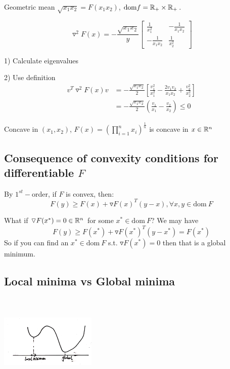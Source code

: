 \begin{example}
	Geometric mean $\sqrt{x_1x_2} = F(x_1x_2)$, $\text{dom}f = \mathbb{R}_+ \times \mathbb{R}_+$.
	
	\begin{equation*}
	\triangledown^2F(x) = -\frac{\sqrt{x_1x_2}}{y}\begin{bmatrix}
	\frac{1}{x^2_1} & -\frac{1}{x_1x_2}\\
	-\frac{1}{x_1x_2} & \frac{1}{x^2_2}
	\end{bmatrix}
	\end{equation*}
	
	1) Calculate eigenvalues
	
	2) Use definition
	\begin{align*}
	v^T\triangledown^2F(x)v &= -\frac{\sqrt{x_1x_2}}{2}[\frac{v_1^2}{x_1^2} - \frac{2v_1v_2}{x_1x_2} + \frac{v_2^2}{x^2_2}]\\
	&= -\frac{\sqrt{x_1x_2}}{2}(\frac{v_1}{x_1} -\frac{v_2}{x_2}) \leq 0
	\end{align*}
	
	Concave in $(x_1, x_2)$, $F(x) = (\prod^n_{i=1}x_i)^{\frac{1}{n}}$ is concave in $x\in \mathbb{R}^n$
\end{example}

\subsection{Consequence of convexity conditions for differentiable $F$}

\quad By $1^{st}-$order, if $F$ is convex, then:
$$F(y)\geq F(x) + \triangledown F(x)^T(y-x), \forall x,y\in \text{dom}\ F$$

What if $\triangledown F(x^*) = 0 \in \mathbb{R}^n$ for some $x^*\in \text{dom}\ F$? We may have
$$F(y)\geq F(x^*) + \triangledown F(x^*)^T(y-x^*)=F(x^*) $$
So if you can find an $x^*\in \text{dom}\ F$ s.t. $\triangledown F(x^*) = 0$ then that is a global minimum.





\subsection{Local minima vs Global minima}

\begin{marginfigure}
	\centering
	\includegraphics[width=1.8in,height=1.8in]{figures/ch08/figure1111_1.png}
\end{marginfigure}

